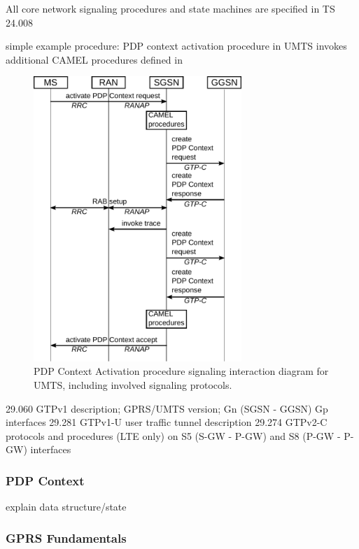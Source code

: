 All core network signaling procedures and state machines are specified in TS 24.008~\cite{3gpp.24.008}

simple example procedure:
	\gls{PDP} context activation procedure in \gls{UMTS}
	invokes additional \gls{CAMEL} procedures defined in \cite{3gpp.23.078}

	\begin{figure}[htb]
		\centering
		\includegraphics[width=0.7\textwidth]{images/pdp-context-activation-procedure.pdf}
		\caption{PDP Context Activation procedure signaling interaction diagram for \gls{UMTS}, including involved signaling protocols.}
		\label{c4:fig:pdpcontextactivationinteraction}
	\end{figure}

	29.060 \cite{3gpp.29.060} GTPv1 description; GPRS/UMTS version; Gn (SGSN - GGSN) Gp interfaces
	29.281 \cite{3gpp.29.281} GTPv1-U user traffic tunnel description
	29.274 \cite{3gpp.29.274} GTPv2-C protocols and procedures (LTE only) on S5 (S-GW - P-GW) and S8 (P-GW - P-GW) interfaces


\subsubsection{\texorpdfstring{\acrshort{PDP}}{PDP} Context}
explain data structure/state

\subsubsection{\texorpdfstring{\acrshort{GPRS}}{GPRS} Fundamentals}

